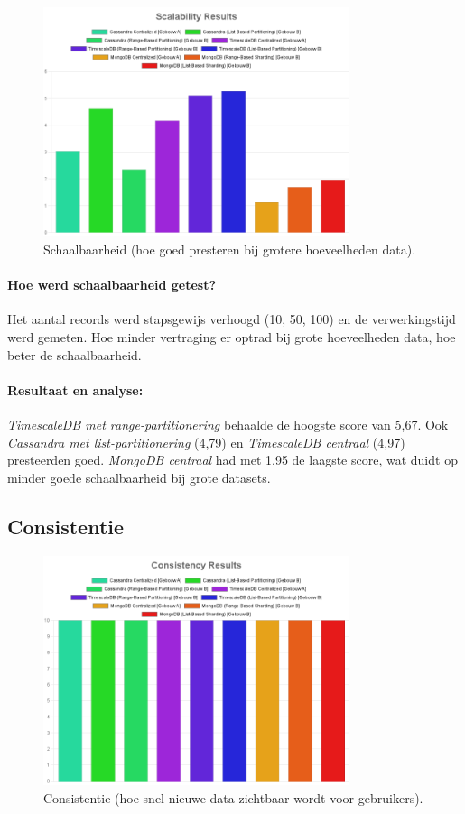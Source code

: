 \begin{figure}[H]
	\centering
	\includegraphics[width=0.8\textwidth]{Scalability.png}
	\caption{Schaalbaarheid (hoe goed presteren bij grotere hoeveelheden data).}
	\label{fig:scalability-comparison}
\end{figure}

\paragraph{Hoe werd schaalbaarheid getest?}
Het aantal records werd stapsgewijs verhoogd (10, 50, 100) en de verwerkingstijd werd gemeten. Hoe minder vertraging er optrad bij grote hoeveelheden data, hoe beter de schaalbaarheid.

\paragraph{Resultaat en analyse:}
\textit{TimescaleDB met range-partitionering} behaalde de hoogste score van 5,67. Ook \textit{Cassandra met list-partitionering} (4,79) en \textit{TimescaleDB centraal} (4,97) presteerden goed. \textit{MongoDB centraal} had met 1,95 de laagste score, wat duidt op minder goede schaalbaarheid bij grote datasets.

\subsection{Consistentie}
\begin{figure}[H]
\centering
\includegraphics[width=0.8\textwidth]{Consistency.png}
\caption{Consistentie (hoe snel nieuwe data zichtbaar wordt voor gebruikers).}
\label{fig:consistency-comparison}
\end{figure}

